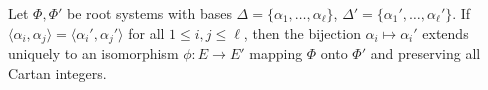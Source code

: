 Let $\Phi, \Phi'$ be root systems with bases $\Delta = \{\alpha_1, \ldots, \alpha_\ell\}$, $\Delta' = \{\alpha_1', \ldots, \alpha_\ell'\}$. If $\langle \alpha_i, \alpha_j \rangle = \langle \alpha_i', \alpha_j' \rangle$ for all $1 \leq i, j \leq \ell$, then the bijection $\alpha_i \mapsto \alpha_i'$ extends uniquely to an isomorphism $\phi: E \to E'$ mapping $\Phi$ onto $\Phi'$ and preserving all Cartan integers.
